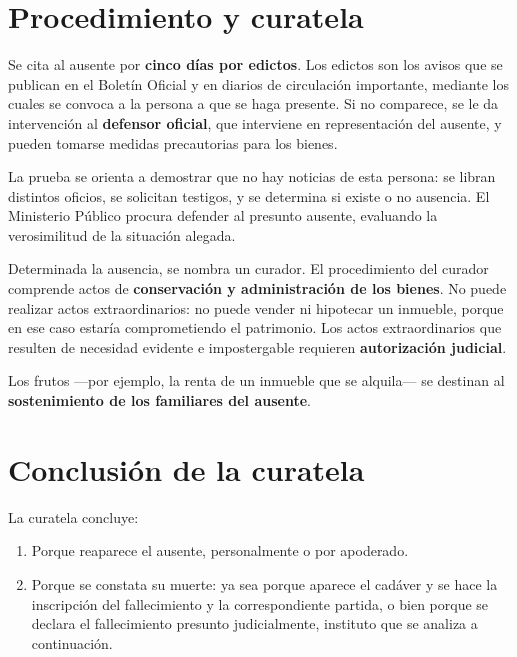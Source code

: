\documentclass[12pt,oneside]{book}
\begin{document}
\section{Procedimiento y curatela}

Se cita al ausente por \textbf{cinco días por edictos}. Los edictos son
los avisos que se publican en el Boletín Oficial y en diarios de
circulación importante, mediante los cuales se convoca a la persona a que
se haga presente. Si no comparece, se le da intervención al
\textbf{defensor oficial}, que interviene en representación del ausente,
y pueden tomarse medidas precautorias para los bienes.

La prueba se orienta a demostrar que no hay noticias de esta persona: se
libran distintos oficios, se solicitan testigos, y se determina si existe
o no ausencia. El Ministerio Público procura defender al presunto
ausente, evaluando la verosimilitud de la situación alegada.

Determinada la ausencia, se nombra un curador. El procedimiento del
curador comprende actos de \textbf{conservación y administración de los
bienes}. No puede realizar actos extraordinarios: no puede vender ni
hipotecar un inmueble, porque en ese caso estaría comprometiendo el
patrimonio. Los actos extraordinarios que resulten de necesidad evidente e
impostergable requieren \textbf{autorización judicial}.

Los frutos —por ejemplo, la renta de un inmueble que se alquila— se
destinan al \textbf{sostenimiento de los familiares del ausente}.

\section{Conclusión de la curatela}

La curatela concluye:

\begin{enumerate}[label=(\alph*)]
    \item Porque reaparece el ausente, personalmente o por apoderado.
    \item Porque se constata su muerte: ya sea porque aparece el cadáver y se hace la inscripción del fallecimiento y la correspondiente partida, o bien porque se declara el fallecimiento presunto judicialmente, instituto que se analiza a continuación.
\end{enumerate}

\end{document}
